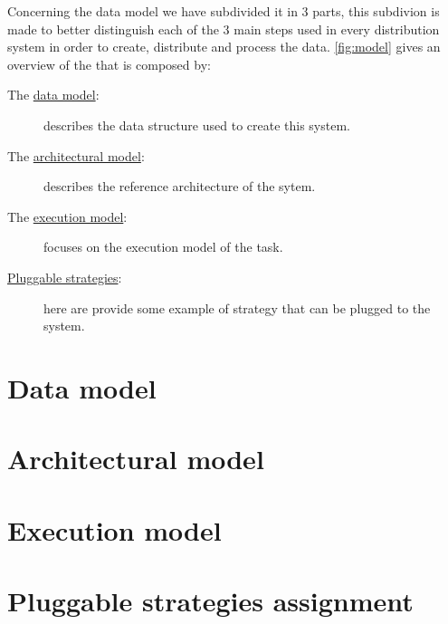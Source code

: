 Concerning the data model we have subdivided it in 3 parts, this subdivion is made to
better distinguish each of the 3 main steps used in every distribution system in order
to create, distribute and process the data. \autoref{fig:model} gives an overview of
the \model that is composed by:
\begin{description}
	\item[The {\hyperref[sec:model:data]{data model}}:] describes
	the data structure used to create this system.

	\item[The {\hyperref[sec:model:architecture]{architectural model}}:] describes
	the reference architecture of the sytem.
	
	\item[The {\hyperref[sec:model:execution]{execution model}}:] focuses
	on the execution model of the task.

	\item[{\hyperref[sec:model:strategies]{Pluggable strategies}}:] here
	are provide some example of strategy that can be plugged to the system.
\end{description}



\section{Data model}
\label{sec:model:data}


\section{Architectural model}
\label{sec:model:architecture}


\section{Execution model}
\label{sec:model:execution}


\section{Pluggable strategies assignment}
\label{sec:model:strategies}
